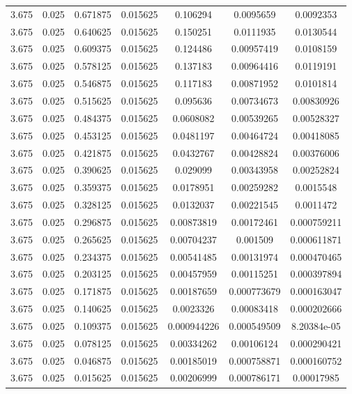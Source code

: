 \begin{flushleft}
\begin{longtable}{ccccccc}
3.675 & 0.025 & 0.671875 & 0.015625 & 0.106294 & 0.0095659 & 0.0092353  \\ 
3.675 & 0.025 & 0.640625 & 0.015625 & 0.150251 & 0.0111935 & 0.0130544  \\ 
3.675 & 0.025 & 0.609375 & 0.015625 & 0.124486 & 0.00957419 & 0.0108159  \\ 
3.675 & 0.025 & 0.578125 & 0.015625 & 0.137183 & 0.00964416 & 0.0119191  \\ 
3.675 & 0.025 & 0.546875 & 0.015625 & 0.117183 & 0.00871952 & 0.0101814  \\ 
3.675 & 0.025 & 0.515625 & 0.015625 & 0.095636 & 0.00734673 & 0.00830926  \\ 
3.675 & 0.025 & 0.484375 & 0.015625 & 0.0608082 & 0.00539265 & 0.00528327  \\ 
3.675 & 0.025 & 0.453125 & 0.015625 & 0.0481197 & 0.00464724 & 0.00418085  \\ 
3.675 & 0.025 & 0.421875 & 0.015625 & 0.0432767 & 0.00428824 & 0.00376006  \\ 
3.675 & 0.025 & 0.390625 & 0.015625 & 0.029099 & 0.00343958 & 0.00252824  \\ 
3.675 & 0.025 & 0.359375 & 0.015625 & 0.0178951 & 0.00259282 & 0.0015548  \\ 
3.675 & 0.025 & 0.328125 & 0.015625 & 0.0132037 & 0.00221545 & 0.0011472  \\ 
3.675 & 0.025 & 0.296875 & 0.015625 & 0.00873819 & 0.00172461 & 0.000759211  \\ 
3.675 & 0.025 & 0.265625 & 0.015625 & 0.00704237 & 0.001509 & 0.000611871  \\ 
3.675 & 0.025 & 0.234375 & 0.015625 & 0.00541485 & 0.00131974 & 0.000470465  \\ 
3.675 & 0.025 & 0.203125 & 0.015625 & 0.00457959 & 0.00115251 & 0.000397894  \\ 
3.675 & 0.025 & 0.171875 & 0.015625 & 0.00187659 & 0.000773679 & 0.000163047  \\ 
3.675 & 0.025 & 0.140625 & 0.015625 & 0.0023326 & 0.00083418 & 0.000202666  \\ 
3.675 & 0.025 & 0.109375 & 0.015625 & 0.000944226 & 0.000549509 & 8.20384e-05  \\ 
3.675 & 0.025 & 0.078125 & 0.015625 & 0.00334262 & 0.00106124 & 0.000290421  \\ 
3.675 & 0.025 & 0.046875 & 0.015625 & 0.00185019 & 0.000758871 & 0.000160752  \\ 
3.675 & 0.025 & 0.015625 & 0.015625 & 0.00206999 & 0.000786171 & 0.00017985  \\ 

\end{longtable}
\end{flushleft}
